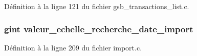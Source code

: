 Définition à la ligne 121 du fichier gsb\_\-transactions\_\-list.c.

\subsubsection[{valeur\_\-echelle\_\-recherche\_\-date\_\-import}]{\setlength{\rightskip}{0pt plus 5cm}gint {\bf valeur\_\-echelle\_\-recherche\_\-date\_\-import}}\label{gsb__file__load_8c_abd82865835fd6c5fcfe97283dbfd0648}


Définition à la ligne 209 du fichier import.c.

